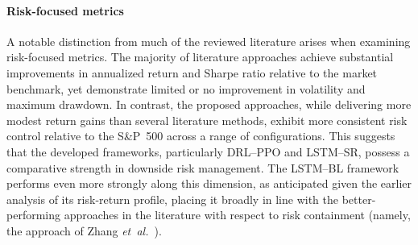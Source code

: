 \paragraph{Risk-focused metrics} A notable distinction from much of the reviewed literature arises when examining risk-focused metrics. The majority of literature approaches achieve substantial improvements in annualized return and Sharpe ratio relative to the market benchmark, yet demonstrate limited or no improvement in volatility and maximum drawdown. In contrast, the proposed approaches, while delivering more modest return gains than several literature methods, exhibit more consistent risk control relative to the S\&P~500 across a range of configurations. This suggests that the developed frameworks, particularly DRL--PPO and LSTM--SR, possess a comparative strength in downside risk management. The LSTM--BL framework performs even more strongly along this dimension, as anticipated given the earlier analysis of its risk-return profile, placing it broadly in line with the better-performing approaches in the literature with respect to risk containment (namely, the approach of Zhang \emph{et~al.}~\cite{984be}).

